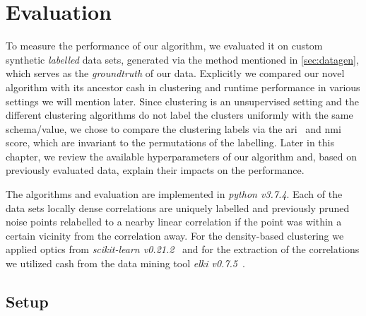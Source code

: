 \chapter{Evaluation}\label{ch:evaluation}
To measure the performance of our algorithm, we evaluated  it on custom synthetic \textit{labelled} data sets, generated via the method mentioned in \autoref{sec:datagen}, which serves as the \textit{groundtruth} of our data. Explicitly we compared our novel algorithm with its ancestor \gls{cash} in clustering and runtime performance in various settings we will mention later. Since clustering is an unsupervised setting and the different clustering algorithms do not label the clusters uniformly with the same schema/value, we chose to compare the clustering labels via the \gls{ari}~\cite{hubert1985comparingari} and \gls{nmi}~\cite{strehl2002clusternmi} score, which are invariant to the permutations of the labelling. Later in this chapter, we review the available hyperparameters of our algorithm and, based on previously evaluated data, explain their impacts on the performance.

The algorithms and evaluation are implemented in \textit{python v3.7.4}. Each of the data sets locally dense correlations are uniquely labelled and previously pruned noise points relabelled to a nearby linear correlation if the point was within a certain vicinity from the correlation away. For the density-based clustering we applied \gls{optics} from \textit{scikit-learn v0.21.2}~\cite{pedregosa2011scikit} and for the extraction of the correlations we utilized \gls{cash} from the data mining tool \textit{\gls{elki} v0.7.5}~\cite{achtert2008elki}. 



\section{Setup}\label{sec:setup}


